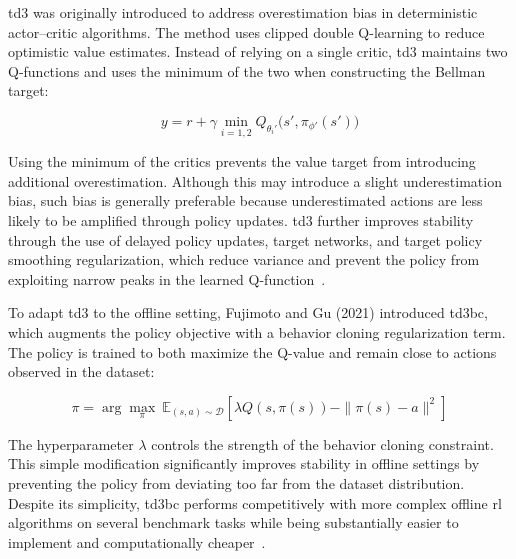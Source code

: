 \vspace{0.5em}

\gls{td3} was originally introduced to address overestimation bias in deterministic actor–critic algorithms.
The method uses clipped double Q-learning to reduce optimistic value estimates.
Instead of relying on a single critic, \gls{td3} maintains two Q-functions and uses the minimum of the two when constructing the Bellman target:

\begin{equation} \label{eq:td3}
    y = r + \gamma \min_{i=1,2} Q_{\theta_i'}\big(s', \pi_{\phi'}(s')\big)
\end{equation}

Using the minimum of the critics prevents the value target from introducing additional overestimation.
Although this may introduce a slight underestimation bias, such bias is generally preferable because underestimated actions are less likely to be amplified through policy updates. \gls{td3} further improves stability through the use of delayed policy updates, target networks, and target policy smoothing regularization, which reduce variance and prevent the policy from exploiting narrow peaks in the learned Q-function~\cite{Fujimoto2018}.

To adapt \gls{td3} to the offline setting, Fujimoto and Gu (2021) introduced \gls{td3bc}, which augments the policy objective with a behavior cloning regularization term.
The policy is trained to both maximize the Q-value and remain close to actions observed in the dataset:

\begin{equation} \label{eq:td3bc}
\pi = \arg\max_{\pi} \ \mathbb{E}_{(s,a)\sim\mathcal{D}}
\left[
\lambda Q(s,\pi(s)) - \|\pi(s) - a\|^2
\right]
\end{equation}

The hyperparameter $\lambda$ controls the strength of the behavior cloning constraint.
This simple modification significantly improves stability in offline settings by preventing the policy from deviating too far from the dataset distribution.
Despite its simplicity, \gls{td3bc} performs competitively with more complex offline \gls{rl} algorithms on several benchmark tasks while being substantially easier to implement and computationally cheaper~\cite{Fujimoto2021}.

